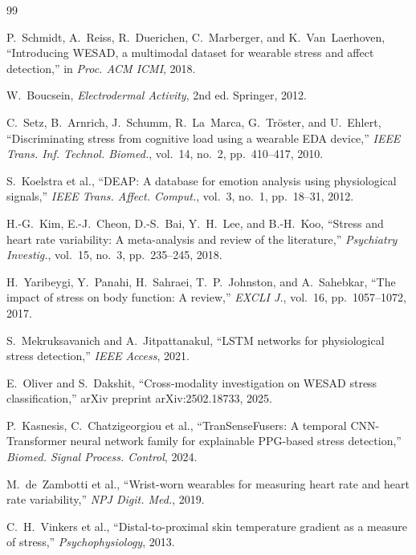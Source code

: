 \documentclass[10pt,twocolumn]{article}
\begin{document}

\begin{thebibliography}{99}

P.~Schmidt, A.~Reiss, R.~Duerichen, C.~Marberger, and K.~Van~Laerhoven,
``Introducing WESAD, a multimodal dataset for wearable stress and affect
detection,'' in \textit{Proc. ACM ICMI}, 2018.

W.~Boucsein, \textit{Electrodermal Activity}, 2nd ed. Springer, 2012.

C.~Setz, B.~Arnrich, J.~Schumm, R.~La~Marca, G.~Tr\"oster, and U.~Ehlert,
``Discriminating stress from cognitive load using a wearable EDA device,''
\textit{IEEE Trans. Inf. Technol. Biomed.}, vol.~14, no.~2, pp.~410--417, 2010.

S.~Koelstra et al., ``DEAP: A database for emotion analysis using physiological
signals,'' \textit{IEEE Trans. Affect. Comput.}, vol.~3, no.~1, pp.~18--31, 2012.

H.-G.~Kim, E.-J.~Cheon, D.-S.~Bai, Y.~H.~Lee, and B.-H.~Koo,
``Stress and heart rate variability: A meta-analysis and review of the
literature,'' \textit{Psychiatry Investig.}, vol.~15, no.~3, pp.~235--245, 2018.

H.~Yaribeygi, Y.~Panahi, H.~Sahraei, T.~P.~Johnston, and A.~Sahebkar,
``The impact of stress on body function: A review,''
\textit{EXCLI J.}, vol.~16, pp.~1057--1072, 2017.

S.~Mekruksavanich and A.~Jitpattanakul,
``LSTM networks for physiological stress detection,''
\textit{IEEE Access}, 2021.

E.~Oliver and S.~Dakshit,
``Cross-modality investigation on WESAD stress classification,''
arXiv preprint arXiv:2502.18733, 2025.

P.~Kasnesis, C.~Chatzigeorgiou et al.,
``TranSenseFusers: A temporal CNN-Transformer neural network family for
explainable PPG-based stress detection,''
\textit{Biomed. Signal Process. Control}, 2024.

M.~de~Zambotti et al.,
``Wrist-worn wearables for measuring heart rate and heart rate variability,''
\textit{NPJ Digit. Med.}, 2019.

C.~H.~Vinkers et al.,
``Distal-to-proximal skin temperature gradient as a measure of stress,''
\textit{Psychophysiology}, 2013.


\end{thebibliography}
\end{document}
